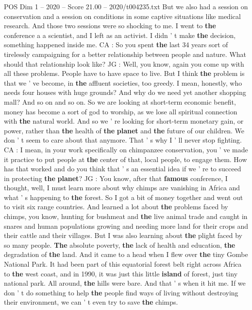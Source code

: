 \begin{textsample}{POS Dim 1 – 2020 – Score 21.00 – 2020/t004235.txt}
But we also had a session on conservation and a session on conditions in some captive situations like medical research.
And those two sessions were so shocking to me.
I went to \textbf{the} conference a a scientist, and I left as an activist.
I didn ' t make \textbf{the} decision, something happened inside me.
CA : So you spent \textbf{the} last 34 years sort of tirelessly campaigning for a better relationship between people and nature.
What should that relationship look like?
JG : Well, you know, again you come up with all these problems.
People have to have space to live.
But I think \textbf{the} problem is that we ' ve become, in \textbf{the} affluent societies, too greedy.
I mean, honestly, who needs four houses with huge grounds?
And why do we need yet another shopping mall?
And so on and so on.
So we are looking at short-term economic benefit, money has become a sort of god to worship, as we lose all spiritual connection with \textbf{the} natural world.
And so we ' re looking for short-term monetary gain, or power, rather than \textbf{the} health of \textbf{the} \textbf{planet} and \textbf{the} future of our children.
We don ' t seem to care about that anymore.
That ' s why I ' ll never stop fighting.
CA : I mean, in your work specifically on chimpanzee conservation, you ' ve made it practice to put people at \textbf{the} center of that, local people, to engage them.
How has that worked and do you think that ' s an essential idea if we ' re to succeed in protecting \textbf{the} \textbf{planet}?
JG : You know, after that \textbf{famous} conference, I thought, well, I must learn more about why chimps are vanishing in Africa and what ' s happening to \textbf{the} forest.
So I got a bit of money together and went out to visit six range countries.
And learned a lot about \textbf{the} problems faced by chimps, you know, hunting for bushmeat and \textbf{the} live animal trade and caught in snares and human populations growing and needing more land for their crops and their cattle and their villages.
But I was also learning about \textbf{the} plight faced by so many people. \textbf{The} absolute poverty, \textbf{the} lack of health and education, \textbf{the} degradation of \textbf{the} land.
And it came to a head when I flew over \textbf{the} tiny Gombe National Park.
It had been part of this equatorial forest belt right across Africa to \textbf{the} west coast, and in 1990, it was just this little \textbf{island} of forest, just tiny national park.
All around, \textbf{the} hills were bare.
And that ' s when it hit me.
If we don ' t do something to help \textbf{the} people find ways of living without destroying their environment, we can ' t even try to save \textbf{the} chimps.

\end{textsample}
